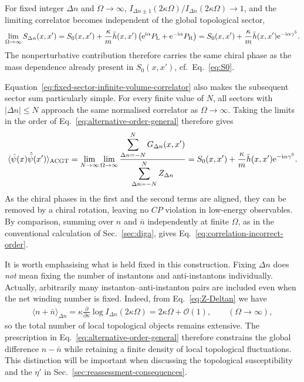 \documentclass[review]{elsarticle}
\numberwithin{equation}{section}
\numberwithin{table}{section}
\numberwithin{figure}{section}
\def\i{\mathrm{i}}
\def\e{\mathrm{e}}
\begin{document}
For fixed integer $\Delta n$ and $\Omega\to\infty$, $I_{\Delta n\pm1}(2\kappa\Omega)/I_{\Delta n}(2\kappa\Omega)\rightarrow1$, and the limiting correlator becomes independent of the global topological sector,
\begin{align}
    \lim_{\Omega\to\infty}
    S_{\Delta n}(x,x')
    =
    S_0(x,x')
    +
    \frac{\kappa}{m}
    \bar h(x,x')
    \left(
        \e^{\i\alpha}P_{\rm L}
        +
        \e^{-\i\alpha}P_{\rm R}
    \right)
    =
    S_0(x,x')
    +
    \frac{\kappa}{m}
    \bar h(x,x')
    \e^{-\i\alpha\gamma^5}.
    \label{eq:fixed-sector-infinite-volume-correlator}
\end{align}
The nonperturbative contribution therefore carries the same chiral phase as the mass dependence already present in $S_0(x,x')$, cf.~Eq.~\eqref{eq:S0}.

Equation~\eqref{eq:fixed-sector-infinite-volume-correlator} also makes the subsequent sector sum particularly simple. For every finite value of $N$, all sectors with $|\Delta n|\leq N$ approach the same normalised correlator as $\Omega\to\infty$. Taking the limits in the order of Eq.~\eqref{eq:alternative-order-general} therefore gives
\begin{align}
    \langle
        \hat\psi(x)\hat{\bar\psi}(x')
    \rangle_{\rm ACGT}
    =
    \lim_{N\to\infty}
    \lim_{\Omega\to\infty}
    \frac{
        \displaystyle
        \sum_{\Delta n=-N}^{N}
        G_{\Delta n}(x,x')
    }{
        \displaystyle
        \sum_{\Delta n=-N}^{N}
        Z_{\Delta n}
    }
    =
    S_0(x,x')
    +
    \frac{\kappa}{m}
    \bar h(x,x')
    \e^{-\i\alpha\gamma^5}.
    \label{correlation:function}
\end{align}
As the chiral phases in the first and the second terms are aligned, they can be removed by a chiral rotation, leaving no $CP$ violation in low-energy observables. By comparison, summing over $n$ and $\bar n$ independently at finite $\Omega$, as in the conventional calculation of Sec.~\ref{sec:diga}, gives Eq.~\eqref{eq:correlation-incorrect-order}. 

It is worth emphasising what is held fixed in this construction. Fixing $\Delta n$ does \emph{not} mean fixing the number of instantons and anti-instantons individually. 
Actually, arbitrarily many instanton--anti-instanton pairs are included even when the net winding number is fixed. Indeed, from Eq.~\eqref{eq:Z-Deltan} we have
\begin{align}
    \langle n+\bar n\rangle_{\Delta n}
    =
    \kappa
    \frac{\partial}{\partial\kappa}
    \log I_{\Delta n}(2\kappa\Omega)
    =
    2\kappa\Omega
    +
    \mathcal O(1),
    \qquad
    (\Omega\to\infty),
    \label{eq:fixed-sector-instanton-density}
\end{align}
so the total number of local topological objects remains extensive. The prescription in Eq.~\eqref{eq:alternative-order-general} therefore constrains the global difference $n-\bar n$ while retaining a finite density of local topological fluctuations. This distinction will be important when discussing the topological susceptibility and the $\eta'$ in Sec.~\ref{sec:reassessment-consequences}.
\end{document}
